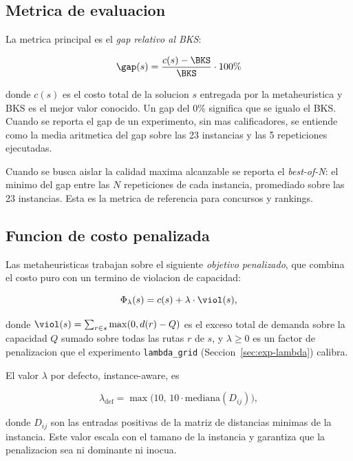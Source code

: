 \subsection{Metrica de evaluacion}
\label{sec:metrica}

La metrica principal es el \emph{gap relativo al BKS}:

\begin{equation}
\gap(s) = \frac{c(s) - \BKS}{\BKS} \cdot 100\%
\label{eq:gap}
\end{equation}

donde $c(s)$ es el costo total de la solucion $s$ entregada por la
metaheuristica y BKS es el mejor valor conocido. Un gap del 0\%
significa que se igualo el BKS. Cuando se reporta el gap de un
experimento, sin mas calificadores, se entiende como la media
aritmetica del gap sobre las 23 instancias y las 5 repeticiones
ejecutadas.

Cuando se busca aislar la calidad maxima alcanzable se reporta el
\emph{best-of-N}: el minimo del gap entre las $N$ repeticiones de cada
instancia, promediado sobre las 23 instancias. Esta es la metrica de
referencia para concursos y rankings.

\subsection{Funcion de costo penalizada}
\label{sec:costo-penalizado}

Las metaheuristicas trabajan sobre el siguiente \emph{objetivo
penalizado}, que combina el costo puro con un termino de violacion de
capacidad:

\begin{equation}
\Phi_\lambda(s) = c(s) + \lambda \cdot \viol(s),
\label{eq:objetivo}
\end{equation}

donde $\viol(s) = \sum_{r \in s} \max(0, d(r) - Q)$ es el exceso total
de demanda sobre la capacidad $Q$ sumado sobre todas las rutas $r$ de
$s$, y $\lambda \ge 0$ es un factor de penalizacion que el experimento
\texttt{lambda\_grid} (Seccion~\ref{sec:exp-lambda}) calibra.

El valor $\lambda$ por defecto, instance-aware, es

\begin{equation}
\lambda_{\text{def}} = \max\bigl(10, \, 10 \cdot \mathrm{mediana}(D_{ij})\bigr),
\label{eq:lambda-def}
\end{equation}

donde $D_{ij}$ son las entradas positivas de la matriz de distancias
minimas de la instancia. Este valor escala con el tamano de la
instancia y garantiza que la penalizacion sea ni dominante ni
inocua.

